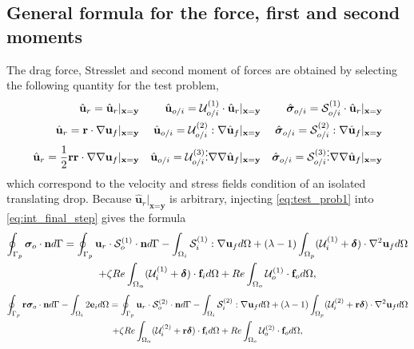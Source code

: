 \subsection{General formula for the force, first and second moments}
The drag force, Stresslet and second moment of forces are obtained by selecting the following quantity for the test problem, 
\begin{align}
    \hat{\textbf{u}}_r = \hat{\textbf{u}}_r|_{\textbf{x}=\textbf{y}} 
    && 
    \hat{\textbf{u}}_{o/i} = \mathcal{U}_{o/i}^{(1)}\cdot \hat{\textbf{u}}_r|_{\textbf{x}=\textbf{y}} 
    && 
    \hat{\bm\sigma}_{o/i} = \mathcal{S}_{o/i}^{(1)}\cdot \hat{\textbf{u}}_r|_{\textbf{x}=\textbf{y}} \\
    \hat{\textbf{u}}_r =\textbf{r}\cdot  \grad \textbf{u}_f|_{\textbf{x}=\textbf{y}} 
    && 
    \hat{\textbf{u}}_{o/i} = \mathcal{U}_{o/i}^{(2)} : \grad\hat{\textbf{u}}_f|_{\textbf{x}=\textbf{y}} 
    && 
    \hat{\bm\sigma}_{o/i} = \mathcal{S}_{o/i}^{(2)} : \grad\hat{\textbf{u}}_f|_{\textbf{x}=\textbf{y}} \\
    \hat{\textbf{u}}_r =\frac{1}{2}\textbf{rr}\cdot  \grad\grad \textbf{u}_f|_{\textbf{x}=\textbf{y}} 
    && 
    \hat{\textbf{u}}_{o/i} = \mathcal{U}_{o/i}^{(3)} \vdots \grad\grad\hat{\textbf{u}}_f|_{\textbf{x}=\textbf{y}} 
    && 
    \hat{\bm\sigma}_{o/i} = \mathcal{S}_{o/i}^{(3)} \vdots \grad\grad\hat{\textbf{u}}_f|_{\textbf{x}=\textbf{y}} 
    \label{eq:test_prob1}
\end{align}
which correspond to the velocity and stress fields condition of an isolated translating drop.
Because $\hat{\textbf{u}}_r|_{\textbf{x}=\textbf{y}} $ is arbitrary, injecting \ref{eq:test_prob1} into \ref{eq:int_final_step} gives the formula
\begin{multline}
    \intS[p]{\bm\sigma_{o}\cdot \textbf{n}}
    =
    \intS[p]{\textbf{u}_{r}\cdot \mathcal{S}_o^{(1)} \cdot \textbf{n}}
    - \intO[i]{ \mathcal{S}_{i}^{(1)} :\grad\textbf{u}_f}
    + (\lambda-1) \intO[p]{(\mathcal{U}_{i}^{(1)} + \bm\delta) \cdot \grad^2   \textbf{u}_f }
    \\ 
    + \zeta Re \intO{(\mathcal{U}_{i}^{(1)} + \bm\delta)\cdot \textbf{f}_{i}} 
    + Re\intO[o]{\mathcal{U}_{o}^{(1)}\cdot \textbf{f}_{o}},
\end{multline}
\begin{multline}
    \intS[p]{\textbf{r}  \bm\sigma_{o}\cdot \textbf{n}}
    - \intO[i]{2\textbf{e}_i}
    =
    \intS[p]{\textbf{u}_{r}\cdot  \mathcal{S}_o^{(2)}\cdot \textbf{n}}
    - \intO[i]{ \mathcal{S}_i^{(2)} :\grad\textbf{u}_f}
    + (\lambda-1) \intO[p]{(\mathcal{U}_{i}^{(2)}  + \textbf{r}\bm\delta) \cdot \grad^2   \textbf{u}_f }
    \\ 
    + \zeta Re \intO{(\mathcal{U}_{i}^{(2)}  + \textbf{r}\bm\delta)\cdot \textbf{f}_{i}} 
    + Re\intO[o]{\mathcal{U}_{o}^{(2)}\cdot \textbf{f}_{o}},
\end{multline}
